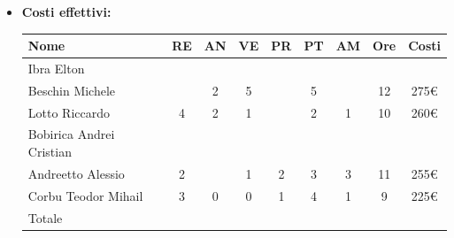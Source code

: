 \begin{itemize}
\begin{longtable}{|c|c|c|c|}
        \hline
        \end{longtable}
    \item \textbf{Costi effettivi:}
    \begin{longtable}{|p{}|c|c|c|c|c|c|c|c|}
        \hline
        Nome & RE & AN & VE & PR & PT & AM & Ore & Costi\\
        \hline
        Ibra \newline Elton & & & & & & & & \\
        \hline
        Beschin Michele & & 2& 5& & 5& & 12& 275€\\
        \hline
        Lotto \newline Riccardo & 4& 2& 1& & 2& 1& 10& 260€\\
        \hline
        Bobirica Andrei Cristian & & & & & & & & \\
        \hline
        Andreetto Alessio & 2& & 1& 2& 3& 3& 11& 255€\\
        \hline
        Corbu Teodor Mihail & 3& 0& 0& 1& 4& 1& 9& 225€\\
        \hline
        Totale & & & & & & & & \\
        \hline
    \end{longtable}
    \end{itemize}

